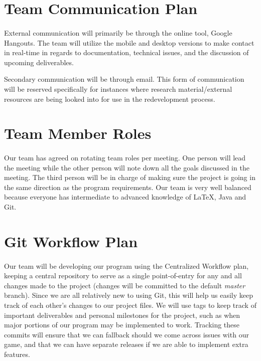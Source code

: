\documentclass{article}
\begin{document}
\section{Team Communication Plan}

\paragraph{}
External communication will primarily be through the online tool, Google Hangouts. The team will utilize the mobile and desktop versions to make contact in real-time in regards to documentation, technical issues, and the discussion of upcoming deliverables.\par Secondary communication will be through email. This form of communication will be reserved specifically for instances where research material/external resources are being looked into for use in the redevelopment process.

\section{Team Member Roles}

\paragraph{}
Our team has agreed on rotating team roles per meeting. One person will lead the meeting while the other person will note down all the goals discussed in the meeting. The third person will be in charge of making sure the project is going in the same direction as the program requirements. Our team is very well balanced because everyone has intermediate to advanced knowledge of LaTeX, Java and Git.

\section{Git Workflow Plan}

\paragraph{}
Our team will be developing our program using the Centralized Workflow plan, keeping a central repository to serve as a single point-of-entry for any and all changes made to the project (changes will be committed to the default \textit{master} branch). Since we are all relatively new to using Git, this will help us easily keep track of each other's changes to our project files. We will use tags to keep track of important deliverables and personal milestones for the project, such as when major portions of our program may be implemented to work. Tracking these commits will ensure that we can fallback should we come across issues with our game, and that we can have separate releases if we are able to implement extra features.
\end{document}
